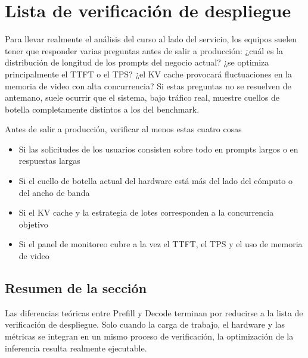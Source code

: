 \section{Lista de verificación de despliegue}
Para llevar realmente el análisis del curso al lado del servicio, los equipos suelen tener que responder varias preguntas antes de salir a producción: ¿cuál es la distribución de longitud de los prompts del negocio actual? ¿se optimiza principalmente el TTFT o el TPS? ¿el KV cache provocará fluctuaciones en la memoria de video con alta concurrencia? Si estas preguntas no se resuelven de antemano, suele ocurrir que el sistema, bajo tráfico real, muestre cuellos de botella completamente distintos a los del benchmark.

\begin{importantbox}{Antes de salir a producción, verificar al menos estas cuatro cosas}
\begin{itemize}
  \item Si las solicitudes de los usuarios consisten sobre todo en prompts largos o en respuestas largas
  \item Si el cuello de botella actual del hardware está más del lado del cómputo o del ancho de banda
  \item Si el KV cache y la estrategia de lotes corresponden a la concurrencia objetivo
  \item Si el panel de monitoreo cubre a la vez el TTFT, el TPS y el uso de memoria de video
\end{itemize}
\end{importantbox}

\subsection{Resumen de la sección}
Las diferencias teóricas entre Prefill y Decode terminan por reducirse a la lista de verificación de despliegue. Solo cuando la carga de trabajo, el hardware y las métricas se integran en un mismo proceso de verificación, la optimización de la inferencia resulta realmente ejecutable.

\newpage
